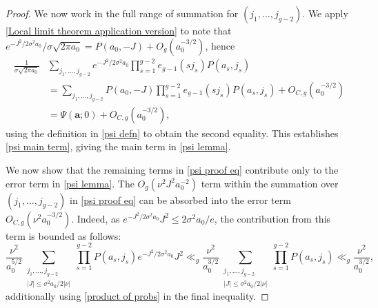 \documentclass[10pt,a4paper]{amsart}
\newcommand{\ru}[1]{e_{g-1}(#1)}
\renewcommand{\leq}{\leqslant}
\begin{document}
\begin{proof}
    We now work in the full range of summation for $(j_{1},\ldots, j_{g-2})$. We apply \cref{Local limit theorem application version} to note that $e^{-J^{2}/2\sigma^{2}a_{0}}/\sigma\sqrt{2\pi a_{0}}=P(a_{0},-J)+O_{g}(a_{0}^{-3/2})$, hence
    \begin{align*}
         \frac{1}{\sigma\sqrt{2\pi a_{0}}}&\sum_{j_{1},\ldots, j_{g-2}}e^{-J^{2}/2\sigma^{2}a_{0}}\prod_{s=1}^{g-2}\ru{sj_{s}}P(a_{s},j_{s})\\&=\sum_{j_{1},\ldots, j_{g-2}}P(a_{0},-J)\prod_{s=1}^{g-2}\ru{sj_{s}}P(a_{s},j_{s})+O_{C,g}(a_{0}^{-3/2})\\
         &=\Psi(\mathbf{a};0)+O_{C,g}(a_{0}^{-3/2}),
    \end{align*}
    using the definition in \cref{psi defn} to obtain the second equality. This establishes \cref{psi main term}, giving the main term in \cref{psi lemma}.

   We now show that the remaining terms in \cref{psi proof eq} contribute only to the error term in \cref{psi lemma}. The $O_{g}(\nu^{2}J^{2}a_{0}^{-2})$ term within the summation over $(j_{1},\ldots, j_{g-2})$ in \cref{psi proof eq} can be absorbed into the error term $O_{C,g}(\nu^{2}a_{0}^{-3/2})$. Indeed, as $e^{-J^{2}/2\sigma^{2}a_{0}}J^{2}\leq 2\sigma^{2}a_{0}/e$, the contribution from this term is bounded as follows:
    \[\frac{\nu^{2}}{a_{0}^{5/2}}\sum_{\substack{j_{1},\ldots, j_{g-2}\\|J|\leq \sigma^{2}a_{0}/2|\nu|}}\prod_{s=1}^{g-2}P(a_{s},j_{s})e^{-J^{2}/2\sigma^{2}a_{0}}J^{2}\ll_{g} \frac{\nu^{2}}{a_{0}^{3/2}}\sum_{\substack{j_{1},\ldots, j_{g-2}\\|J|\leq \sigma^{2}a_{0}/2|\nu|}}\prod_{s=1}^{g-2}P(a_{s},j_{s})\ll_{g} \frac{\nu^{2}}{a_{0}^{3/2}},\]
    additionally using \cref{product of probs} in the final inequality. 


\end{proof}
\end{document}
